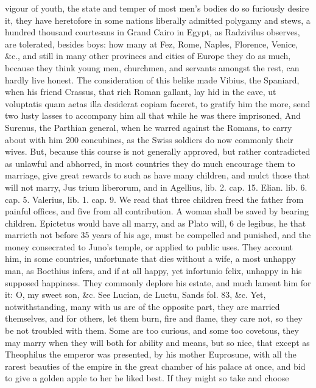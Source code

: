 {vigour of youth, the state and temper of most men's bodies do so
furiously desire it, they have heretofore in some nations liberally
admitted polygamy and stews, a hundred thousand courtesans in Grand
Cairo in Egypt, as Radzivilus observes, are tolerated, besides
boys: how many at Fez, Rome, Naples, Florence, Venice, \&c., and still
in many other provinces and cities of Europe they do as much, because
they think young men, churchmen, and servants amongst the rest, can
hardly live honest. The consideration of this belike made Vibius, the
Spaniard, when his friend Crassus, that rich Roman gallant, lay
hid in the cave, ut voluptatis quam aetas illa desiderat copiam
faceret, to gratify him the more, send two lusty lasses to
accompany him all that while he was there imprisoned, And Surenus, the
Parthian general, when he warred against the Romans, to carry about
with him 200 concubines, as the Swiss soldiers do now commonly their
wives. But, because this course is not generally approved, but rather
contradicted as unlawful and abhorred, in most countries they do
much encourage them to marriage, give great rewards to such as have
many children, and mulct those that will not marry, Jus trium
liberorum, and in Agellius, lib. 2. cap. 15. Elian. lib. 6. cap. 5.
Valerius, lib. 1. cap. 9. We read that three children freed the
father from painful offices, and five from all contribution. A woman
shall be saved by bearing children. Epictetus would have all marry, and
as Plato will, 6 de legibus, he that marrieth not before 35 years
of his age, must be compelled and punished, and the money consecrated
to Juno's temple, or applied to public uses. They account him, in
some countries, unfortunate that dies without a wife, a most unhappy
man, as Boethius infers, and if at all happy, yet infortunio
felix, unhappy in his supposed happiness. They commonly deplore his
estate, and much lament him for it: O, my sweet son, \&c. See Lucian, de
Luctu, Sands fol. 83, \&c.
Yet, notwithstanding, many with us are of the opposite part, they are
married themselves, and for others, let them burn, fire and flame, they
care not, so they be not troubled with them. Some are too curious, and
some too covetous, they may marry when they will both for ability and
means, but so nice, that except as Theophilus the emperor was
presented, by his mother Euprosune, with all the rarest beauties of the
empire in the great chamber of his palace at once, and bid to give a
golden apple to her he liked best. If they might so take and choose
}
